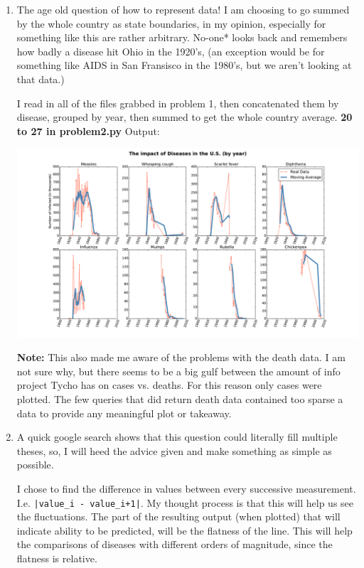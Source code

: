 \documentclass[]{article}
\begin{document}
\begin{enumerate}
\vspace{2em}
\item The age old question of how to represent data! I am choosing to go summed by the whole country as state boundaries, in my opinion, especially for something like this are rather arbitrary. No-one*  looks back and remembers how badly a disease hit Ohio in the 1920’s, (an exception would be for something like AIDS in San Fransisco in the 1980’s, but we aren’t looking at that data.) 

I read in all of the files grabbed in problem 1, then concatenated them by disease, grouped by year, then summed to get the whole country average. \textbf{20 to 27 in problem2.py}
\newpage
{\large Output:}

\centerline{\includegraphics[scale = 0.4]{figures/diseaseCasesByYear.pdf}}


\textbf{Note:} This also made me aware of the problems with the death data. I am not sure why, but there seems to be a big gulf between the amount of info project Tycho has on cases vs. deaths. For this reason only cases were plotted. The few queries that did return death data contained too sparse a data to provide any meaningful plot or takeaway. 

\vspace{2em}
\item A quick google search shows that this question could literally fill multiple theses, so, I will heed the advice given and make something as simple as possible. 

I chose to find the difference in values between every successive measurement. I.e. \texttt{|value\_i - value\_i+1|}. My thought process is that this will help us see the fluctuations. The part of the resulting output (when plotted) that will indicate ability to be predicted, will be the flatness of the line. This will help the comparisons of diseases with different orders of magnitude, since the flatness is relative. 


\end{enumerate}
\end{document}
